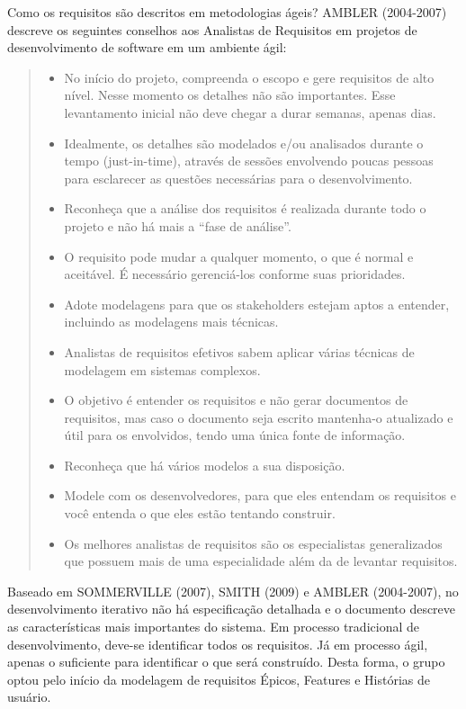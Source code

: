 Como os requisitos são descritos em metodologias ágeis?
AMBLER (2004-2007) descreve os seguintes conselhos aos Analistas de Requisitos em projetos de desenvolvimento de software em um ambiente ágil:
\begin{quote} 
    \begin{itemize}
        \item No início do projeto, compreenda o escopo e gere requisitos de alto nível. Nesse momento os detalhes não são importantes. Esse levantamento inicial não deve chegar a durar semanas, apenas dias.
        \item Idealmente, os detalhes são modelados e/ou analisados durante o tempo (just-in-time), através de sessões envolvendo poucas pessoas para esclarecer as questões necessárias para o desenvolvimento.
        \item Reconheça que a análise dos requisitos é realizada durante todo o projeto e não há mais a “fase de análise”.
        \item O requisito pode mudar a qualquer momento, o que é normal e aceitável. É necessário gerenciá-los conforme suas prioridades.
        \item Adote modelagens para que os stakeholders estejam aptos a entender, incluindo as modelagens mais técnicas.
        \item Analistas de requisitos efetivos sabem aplicar várias técnicas de modelagem em sistemas complexos.
        \item O objetivo é entender os requisitos e não gerar documentos de requisitos, mas caso o documento seja escrito mantenha-o atualizado e útil para os envolvidos, tendo uma única fonte de informação.
        \item Reconheça que há vários modelos a sua disposição.
        \item Modele com os desenvolvedores, para que eles entendam os requisitos e você entenda o que eles estão tentando construir.
        \item Os melhores analistas de requisitos são os especialistas generalizados que possuem mais de uma especialidade além da de levantar requisitos.
    \end{itemize}
\end{quote}

Baseado em SOMMERVILLE (2007), SMITH (2009) e AMBLER (2004-2007), no desenvolvimento iterativo não há especificação detalhada e o documento descreve as características mais importantes do sistema. Em processo tradicional de desenvolvimento, deve-se identificar todos os requisitos. Já em processo ágil, apenas o suficiente para identificar o que será construído. Desta forma, o grupo optou pelo início da modelagem de requisitos Épicos, Features e Histórias de usuário.

